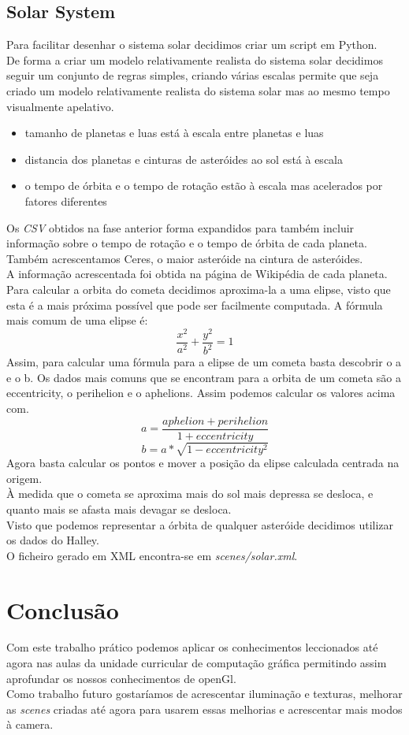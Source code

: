 \documentclass[a4paper]{report}
\begin{document}
\section{Solar System}
Para facilitar desenhar o sistema solar decidimos criar um script em Python.\\
De forma a criar um modelo relativamente realista do sistema solar decidimos
seguir um conjunto de regras simples, criando várias escalas permite que seja
criado um modelo relativamente realista do sistema solar mas ao mesmo tempo
visualmente apelativo.\\

\begin{itemize}
        \item tamanho de planetas e luas está à escala entre planetas e luas
        \item distancia dos planetas e cinturas de asteróides ao sol está à
            escala
        \item o tempo de órbita e o tempo de rotação estão à escala mas
            acelerados por fatores diferentes
\end{itemize}
Os \textit{CSV} obtidos na fase anterior forma expandidos para também incluir
informação sobre o tempo de rotação e o tempo de órbita de cada planeta. Também
acrescentamos Ceres, o maior asteróide na cintura de asteróides.\\
A informação acrescentada foi obtida na página de Wikipédia de cada planeta.\\
Para calcular a orbita do cometa decidimos aproxima-la a uma elipse, visto que
esta é a mais próxima possível que pode ser facilmente computada. A fórmula mais
comum de uma elipse é:
\[ \frac{x^2}{a^2} + \frac{y^2}{b^2} = 1 \]
Assim, para calcular uma fórmula para a elipse de um cometa basta descobrir o a
e o b. Os dados mais comuns que se encontram para a orbita de um cometa são a
eccentricity, o perihelion e o aphelions. Assim podemos calcular os valores
acima com.
\[ a = \frac{aphelion + perihelion}{1 + eccentricity} \]
\[ b = a * \sqrt{1 - eccentricity^2} \]
Agora basta calcular os pontos e mover a posição da elipse calculada centrada na
origem.\\
À medida que o cometa se aproxima mais do sol mais depressa se desloca, e quanto
mais se afasta mais devagar se desloca.\\
Visto que podemos representar a órbita de qualquer asteróide decidimos utilizar
os dados do Halley.\\
O ficheiro gerado em XML encontra-se em \textit{scenes/solar.xml}.

\chapter{Conclusão}
Com este trabalho prático podemos aplicar os conhecimentos leccionados até agora
nas aulas da unidade curricular de computação gráfica permitindo assim
aprofundar os nossos conhecimentos de openGl.\\
Como trabalho futuro gostaríamos de acrescentar iluminação e texturas, melhorar
as \textit{scenes} criadas até agora para usarem essas melhorias e acrescentar
mais modos à camera.
\end{document}
